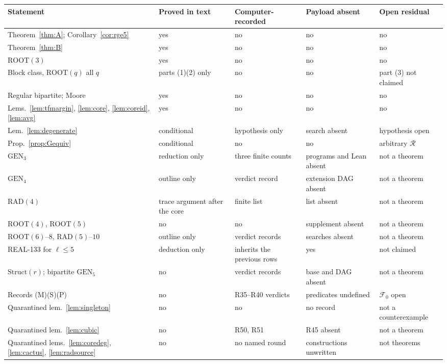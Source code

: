\documentclass[11pt]{amsart}
\theoremstyle{definition}
\theoremstyle{remark}
\newcommand{\lr}{\ell}
\newcommand{\GEN}{\mathrm{GEN}}
\newcommand{\RAD}{\mathrm{RAD}}
\newcommand{\ROOT}{\mathrm{ROOT}}
\begin{document}
\begin{table}[ht]
\centering\footnotesize
\begin{tabular}{@{}p{3.85cm}p{2.15cm}p{2.45cm}p{2.45cm}p{2.55cm}@{}}
\toprule
Statement & Proved in text & Computer-recorded & Payload absent & Open residual\\
\midrule
Theorem~\ref{thm:A}; Corollary~\ref{cor:rge5} & yes & no & no & no\\
Theorem~\ref{thm:B} & yes & no & no & no\\
$\ROOT(3)$ & yes & no & no & no\\
Block class, $\ROOT(q)$ all $q$ & parts (1)(2) only & no & no & part (3) not claimed\\
Regular bipartite; Moore & yes & no & no & no\\
Lems.~\ref{lem:tfmargin}, \ref{lem:core}, \ref{lem:coreid}, \ref{lem:avg} & yes & no & no & no\\
Lem.~\ref{lem:degenerate} & conditional & hypothesis only & search absent & hypothesis open\\
Prop.~\ref{prop:Gequiv} & conditional & no & no & arbitrary $\mathcal R$\\
$\GEN_3$ & reduction only & three finite counts & programs and Lean absent & not a theorem\\
$\GEN_4$ & outline only & verdict record & extension DAG absent & not a theorem\\
$\RAD(4)$ & trace argument after the core & finite list & list absent & not a theorem\\
$\ROOT(4)$, $\ROOT(5)$ & no & no & supplement absent & not a theorem\\
$\ROOT(6)$--$8$, $\RAD(5)$--$10$ & outline only & verdict records & searches absent & not a theorem\\
REAL-133 for $\lr\le 5$ & deduction only & inherits the previous rows & yes & not claimed\\
$\mathrm{Struct}(r)$; bipartite $\GEN_5$ & no & verdict records & base and DAG absent & not a theorem\\
Records (M)(S)(P) & no & R35--R40 verdicts & predicates undefined & $\mathcal F_0$ open\\
Quarantined lem.~\ref{lem:singleton} & no & no & no record & not a counterexample\\
Quarantined lem.~\ref{lem:cubic} & no & R50, R51 & R45 absent & not a theorem\\
Quarantined lems.~\ref{lem:coredeg}, \ref{lem:cactus}, \ref{lem:radsource} & no & no named round & constructions unwritten & not theorems\\

\end{tabular}
\end{table}
\end{document}
